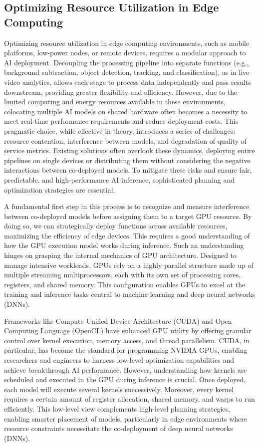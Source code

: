 \subsection{Optimizing Resource Utilization in Edge Computing}

Optimizing resource utilization in edge computing environments, such as mobile platforms, low-power nodes, or remote devices, requires a modular approach to AI deployment. Decoupling the processing pipeline into separate functions (e.g., background subtraction, object detection, tracking, and classification), as in live video analytics, allows each stage to process data independently and pass results downstream, providing greater flexibility and efficiency. However, due to the limited computing and energy resources available in these environments, colocating multiple AI models on shared hardware often becomes a necessity to meet real-time performance requirements and reduce deployment costs. This pragmatic choice, while effective in theory, introduces a series of challenges: resource contention, interference between models, and degradation of quality of service metrics. Existing solutions often overlook these dynamics, deploying entire pipelines on single devices or distributing them without considering the negative interactions between co-deployed models. To mitigate these risks and ensure fair, predictable, and high-performance AI inference, sophisticated planning and optimization strategies are essential.

A fundamental first step in this process is to recognize and measure interference between co-deployed models before assigning them to a target GPU resource. By doing so, we can strategically deploy functions across available resources, maximizing the efficiency of edge devices. This requires a good understanding of how the GPU execution model works during inference. Such an understanding hinges on grasping the internal mechanics of GPU architecture. Designed to manage intensive workloads, GPUs rely on a highly parallel structure made up of multiple streaming multiprocessors, each with its own set of processing cores, registers, and shared memory. This configuration enables GPUs to excel at the training and inference tasks central to machine learning and deep neural networks (DNNs).

Frameworks like Compute Unified Device Architecture (CUDA) and Open Computing Language (OpenCL) have enhanced GPU utility by offering granular control over kernel execution, memory access, and thread parallelism. CUDA, in particular, has become the standard for programming NVIDIA GPUs, enabling researchers and engineers to harness low-level optimization capabilities and achieve breakthrough AI performance. However, understanding how kernels are scheduled and executed in the GPU during inference is crucial. Once deployed, each model will execute several kernels successively. Moreover, every kernel requires a certain amount of register allocation, shared memory, and warps to run efficiently. This low-level view complements high-level planning strategies, enabling smarter placement of models, particularly in edge environments where resource constraints necessitate the co-deployment of deep neural networks (DNNs).

